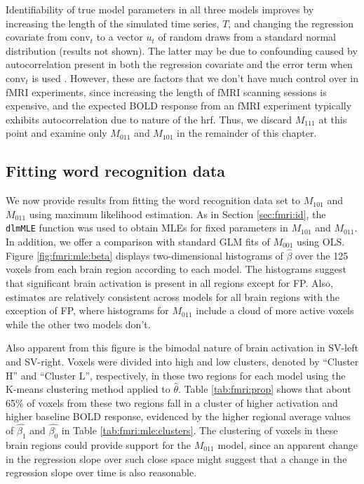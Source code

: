 Identifiability of true model parameters in all three models improves by increasing the length of the simulated time series, $T$, and changing the regression covariate from $\mbox{conv}_t$ to a vector $u_t$ of random draws from a standard normal distribution (results not shown). The latter may be due to confounding caused by autocorrelation present in both the regression covariate and the error term when $\mbox{conv}_t$ is used \citep{hodges:reich:confound:2010}. However, these are factors that we don't have much control over in fMRI experiments, since increasing the length of fMRI scanning sessions is expensive, and the expected BOLD response from an fMRI experiment typically exhibits autocorrelation due to nature of the hrf. Thus, we discard $M_{111}$ at this point and examine only $M_{011}$ and $M_{101}$ in the remainder of this chapter.

\subsection{Fitting word recognition data \label{sec:fmri:mle}}

We now provide results from fitting the word recognition data set to $M_{101}$ and $M_{011}$ using maximum likelihood estimation. As in Section \ref{sec:fmri:id}, the {\tt dlmMLE} function was used to obtain MLEs for fixed parameters in $M_{101}$ and $M_{011}$. In addition, we offer a comparison with standard GLM fits of $M_{001}$ using OLS. Figure \ref{fig:fmri:mle:beta} displays two-dimensional histograms of $\hat{\beta}$ over the 125 voxels from each brain region according to each model. The histograms suggest that significant brain activation is present in all regions except for FP. Also, estimates are relatively consistent across models for all brain regions with the exception of FP, where histograms for $M_{011}$ include a cloud of more active voxels while the other two models don't.

Also apparent from this figure is the bimodal nature of brain activation in SV-left and SV-right. Voxels were divided into high and low clusters, denoted by ``Cluster H'' and ``Cluster L'', respectively, in these two regions for each model using the K-means clustering method \citep{hartigan:wong:kmeans:1979} applied to $\hat{\theta}$. Table \ref{tab:fmri:prop} shows that about 65\% of voxels from these two regions fall in a cluster of higher activation and higher baseline BOLD response, evidenced by the higher regional average values of $\hat{\beta_1}$ and $\hat{\beta_0}$ in Table \ref{tab:fmri:mle:clusters}. The clustering of voxels in these brain regions could provide support for the $M_{011}$ model, since an apparent change in the regression slope over such close space might suggest that a change in the regression slope over time is also reasonable.

